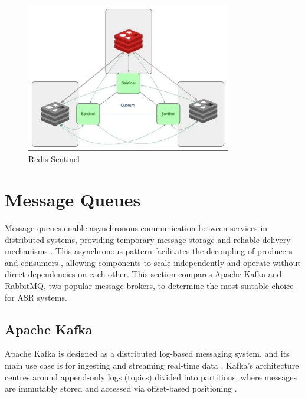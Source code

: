 \begin{figure}[H]
    \centering
    \includegraphics[width=0.8\textwidth]{figures/redis_sentinel.png}
    \caption{Redis Sentinel}
    \label{fig:redis_sentinel}
\end{figure}

\section{Message Queues}
Message queues enable asynchronous communication between services in distributed systems, providing temporary message storage and reliable delivery mechanisms \cite{queue_definition}. This asynchronous pattern facilitates the decoupling of producers and consumers \cite{queue_decouple}, allowing components to scale independently and operate without direct dependencies on each other. This section compares Apache Kafka and RabbitMQ, two popular message brokers, to determine the most suitable choice for ASR systems.
\subsection{Apache Kafka}
Apache Kafka is designed as a distributed log-based messaging system, and its main use case is for ingesting and streaming real-time data \cite{kafka_definition}. Kafka's architecture centres around append-only logs (topics) divided into partitions, where messages are immutably stored and accessed via offset-based positioning \cite{kafka_documentation}.

